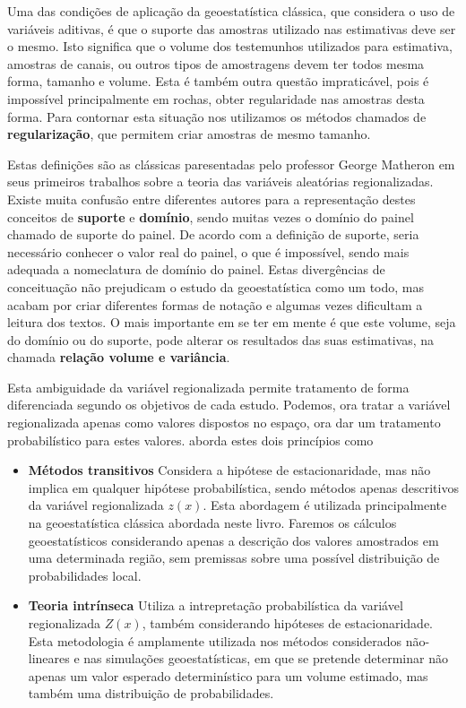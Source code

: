 Uma das condições de aplicação da geoestatística clássica, que considera o uso de variáveis aditivas, é que o suporte das amostras utilizado nas estimativas deve ser o mesmo. Isto significa que o volume dos testemunhos utilizados para estimativa, amostras de canais, ou outros tipos de amostragens devem ter todos mesma forma, tamanho e volume. Esta é também outra questão impraticável, pois é impossível principalmente em rochas, obter regularidade nas amostras desta forma. Para contornar esta situação nos utilizamos os métodos chamados de \textbf{regularização}, que permitem criar amostras de mesmo tamanho. 



Estas definições são as clássicas paresentadas pelo professor George Matheron em seus primeiros trabalhos sobre a teoria das variáveis aleatórias regionalizadas. Existe muita confusão entre diferentes autores para a representação destes conceitos de \textbf{suporte} e \textbf{domínio}, sendo muitas vezes o domínio do painel chamado de suporte do painel. De acordo com a definição de suporte, seria necessário conhecer o valor real do painel, o que é impossível, sendo mais adequada a nomeclatura de domínio do painel. Estas divergências de conceituação não prejudicam o estudo da geoestatística como um todo, mas acabam por criar diferentes formas de notação e algumas vezes dificultam a leitura dos textos. O mais importante em se ter em mente é que este volume, seja do domínio ou do suporte, pode alterar os resultados das suas estimativas, na chamada \textbf{relação volume e variância}.



Esta ambiguidade da variável regionalizada permite tratamento de forma diferenciada segundo os objetivos de cada estudo. Podemos, ora tratar a variável regionalizada apenas como valores dispostos no espaço, ora dar um tratamento probabilístico para estes valores. \citet{matheron1963principles} aborda estes dois princípios como 

\begin{itemize}
	\item \textbf{Métodos transitivos} Considera a hipótese de estacionaridade, mas não implica em qualquer hipótese probabilística, sendo métodos apenas descritivos da variável regionalizada $z(x)$. Esta abordagem é utilizada principalmente na geoestatística clássica abordada neste livro. Faremos os cálculos geoestatísticos considerando apenas a descrição dos valores amostrados em uma determinada região, sem premissas sobre uma possível distribuição de probabilidades local. 
	\item \textbf{Teoria intrínseca} Utiliza a intrepretação probabilística da variável regionalizada $Z(x)$, também considerando hipóteses de estacionaridade. Esta metodologia é amplamente utilizada nos métodos considerados não-lineares e nas simulações geoestatísticas, em que se pretende determinar não apenas um valor esperado determinístico para um volume estimado, mas também uma distribuição de probabilidades.  
\end{itemize}

